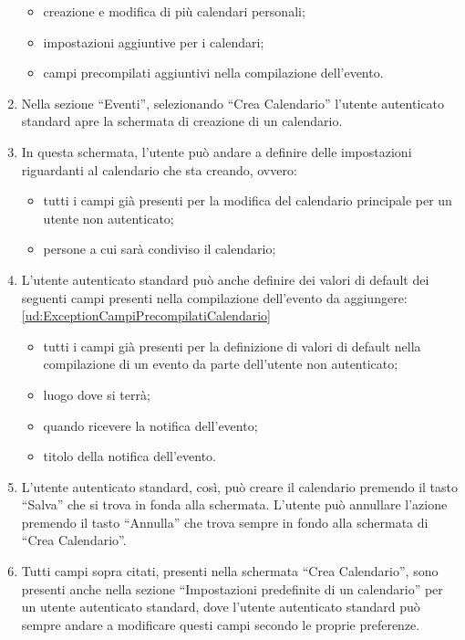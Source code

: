 \begin{listaPersonale}[UC]{}
\begin{enumerate}
              \begin{itemize}
                  \item creazione e modifica di più calendari personali;
                  \item impostazioni aggiuntive per i calendari;
                  \item campi precompilati aggiuntivi nella compilazione dell'evento.
              \end{itemize}
        \item Nella sezione “Eventi”, selezionando “Crea Calendario” l'utente autenticato standard apre la schermata di creazione di un calendario.
        \item In questa schermata, l'utente può andare a definire delle impostazioni riguardanti al calendario che sta creando, ovvero:
              \begin{itemize}
                  \item tutti i campi già presenti per la modifica del calendario principale per un utente non autenticato;
                  \item persone a cui sarà condiviso il calendario;
              \end{itemize}
        \item L'utente autenticato standard può anche definire dei valori di default dei seguenti campi presenti nella compilazione dell'evento da aggiungere: \ref{ud:ExceptionCampiPrecompilatiCalendario}
              \begin{itemize}
                  \item tutti i campi già presenti per la definizione di valori di default nella compilazione di un evento da parte dell'utente non autenticato;
                  \item luogo dove si terrà;
                  \item quando ricevere la notifica dell'evento;
                  \item titolo della notifica dell'evento.
              \end{itemize}
        \item L'utente autenticato standard, così, può creare il calendario premendo il tasto “Salva” che si trova in fonda alla schermata. L'utente può annullare l'azione premendo il tasto “Annulla” che trova sempre in fondo alla schermata di “Crea Calendario”.
        \item Tutti campi sopra citati, presenti nella schermata “Crea Calendario”, sono presenti anche nella sezione “Impostazioni predefinite di un calendario” per un utente autenticato standard, dove l'utente autenticato standard può sempre andare a modificare questi campi secondo le proprie preferenze. 

\end{enumerate}
\end{listaPersonale}
